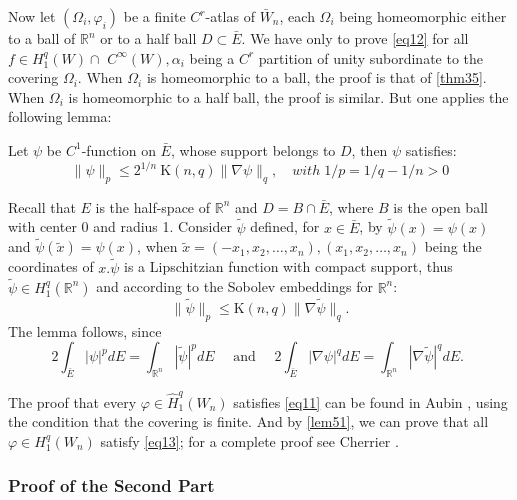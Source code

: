 \documentclass[12pt,hyperref,a4paper,UTF8]{ctexart}
\begin{document}
\noindent
Now let $\left(\Omega_i, \varphi_i\right)$ be a finite $C^r$-atlas of $\bar{W}_n$, each $\Omega_i$ being homeomorphic either to a ball of $\mathbb{R}^n$ or to a half ball $D \subset \bar{E}$. We have only to prove \autoref{eq12} for all $f \in H_1^q(W) \cap$ $C^{\infty}(W), \alpha_i$ being a $C^r$ partition of unity subordinate to the covering $\Omega_i$. When $\Omega_i$ is homeomorphic to a ball, the proof is that of \autoref{thm35}. When $\Omega_i$ is homeomorphic to a half ball, the proof is similar. But one applies the following lemma:

\begin{Lemma}
    Let $\psi$ be $C^1$-function on $\bar{E}$, whose support belongs to $D$, then $\psi$ satisfies:
$$
\|\psi\|_p \leq 2^{1 / n} \mathrm{~K}(n, q)\|\nabla \psi\|_q, \quad with  \;1 / p=1 / q-1 / n>0
$$
\label{lem51}
\end{Lemma}

\vskip -23pt
\begin{Proof}
    Recall that $E$ is the half-space of $\mathbb{R}^n$ and $D=B \cap \bar{E}$, where $B$ is the open ball with center 0 and radius 1. 
    Consider $\tilde{\psi}$ defined, for $x \in \bar{E}$, by $\tilde{\psi}(x)=\psi(x)$ and $\tilde{\psi}(\tilde{x})=\psi(x)$, when $\tilde{x}=\left(-x_1, x_2, \ldots, x_n\right),\left(x_1, x_2, \ldots, x_n\right)$ being the coordinates of $x . \tilde{\psi}$ is a Lipschitzian function with compact support, thus $\tilde{\psi} \in H_1^q\left(\mathbb{R}^n\right)$ and according to the Sobolev embeddings for $\mathbb{R}^n$:
    $$
    \|\tilde{\psi}\|_p \leq \mathrm{K}(n, q)\|\nabla \tilde{\psi}\|_q .
    $$
    The lemma follows, since
    $$
    2 \int_{\bar{E}}|\psi|^p d E=\int_{\mathbb{R}^n}|\tilde{\psi}|^p d E \quad \text { and } \quad 2 \int_{\bar{E}}|\nabla \psi|^q d E=\int_{\mathbb{R}^n}|\nabla \tilde{\psi}|^q d E \text {. }
    $$\end{Proof}

The proof that every $\varphi \in \hat{H}_1^q\left(W_n\right)$ satisfies \autoref{eq11} can be found in Aubin \cite{Aubin}, using the condition that the covering is finite.
And by \autoref{lem51}, we can prove that all $\varphi \in H_1^q\left(W_n\right)$ satisfy \autoref{eq13}; for a complete proof see Cherrier \cite{Cherrier}.

\subsubsection{Proof of the Second Part}
\end{document}
